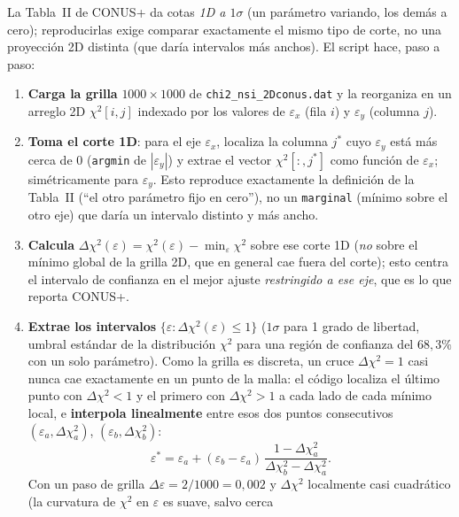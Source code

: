 \documentclass[11pt,a4paper]{article}
\newcommand{\eps}{\varepsilon}
\newcommand{\code}[1]{\texttt{#1}}
\begin{document}
La Tabla~II de CONUS+ da cotas \emph{1D a $1\sigma$} (un par\'ametro variando,
los dem\'as a cero); reproducirlas exige comparar exactamente el mismo tipo de
corte, no una proyecci\'on 2D distinta (que dar\'ia intervalos m\'as anchos). El
script hace, paso a paso:
\begin{enumerate}\itemsep2pt
  \item \textbf{Carga la grilla} $1000\times1000$ de \code{chi2\_nsi\_2Dconus.dat}
    y la reorganiza en un arreglo 2D $\chi^{2}[i,j]$ indexado por los valores de
    $\eps_{x}$ (fila $i$) y $\eps_{y}$ (columna $j$).
  \item \textbf{Toma el corte 1D}: para el eje $\eps_{x}$, localiza la columna
    $j^{*}$ cuyo $\eps_{y}$ est\'a m\'as cerca de $0$ (\code{argmin} de
    $|\eps_{y}|$) y extrae el vector $\chi^{2}[:,j^{*}]$ como funci\'on de
    $\eps_{x}$; sim\'etricamente para $\eps_{y}$. Esto reproduce exactamente la
    definici\'on de la Tabla~II (``el otro par\'ametro fijo en cero''), no un
    \code{marginal} (m\'inimo sobre el otro eje) que dar\'ia un intervalo distinto
    y m\'as ancho.
  \item \textbf{Calcula} $\Delta\chi^{2}(\eps) = \chi^{2}(\eps) -
    \min_{\eps}\chi^{2}$ sobre ese corte 1D (\emph{no} sobre el m\'inimo global de
    la grilla 2D, que en general cae fuera del corte); esto centra el intervalo
    de confianza en el mejor ajuste \emph{restringido a ese eje}, que es lo que
    reporta CONUS+.
  \item \textbf{Extrae los intervalos} $\{\eps:\Delta\chi^{2}(\eps)\le 1\}$
    ($1\sigma$ para 1 grado de libertad, umbral est\'andar de la distribuci\'on
    $\chi^{2}$ para una regi\'on de confianza del $68{,}3\%$ con un solo
    par\'ametro). Como la grilla es discreta, un cruce $\Delta\chi^{2}=1$ casi
    nunca cae exactamente en un punto de la malla: el c\'odigo localiza el
    \'ultimo punto con $\Delta\chi^{2}<1$ y el primero con $\Delta\chi^{2}>1$ a
    cada lado de cada m\'inimo local, e \textbf{interpola linealmente} entre esos
    dos puntos consecutivos $(\eps_{a},\Delta\chi^{2}_{a})$,
    $(\eps_{b},\Delta\chi^{2}_{b})$:
    \begin{equation}
      \label{eq:cross_interp}
      \eps^{*} = \eps_{a} + (\eps_{b}-\eps_{a})\,
        \frac{1-\Delta\chi^{2}_{a}}{\Delta\chi^{2}_{b}-\Delta\chi^{2}_{a}} .
    \end{equation}
    Con un paso de grilla $\Delta\eps=2/1000=0{,}002$ y $\Delta\chi^{2}$ localmente
    casi cuadr\'atico (la curvatura de $\chi^{2}$ en $\eps$ es suave, salvo cerca

\end{enumerate}
\end{document}
